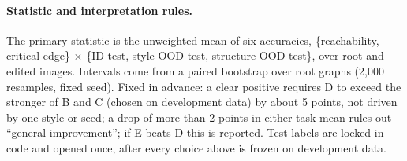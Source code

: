 \paragraph{Statistic and interpretation rules.}
The primary statistic is the unweighted mean of six accuracies, \{reachability, critical
edge\} $\times$ \{ID test, style-OOD test, structure-OOD test\}, over root and edited images.
Intervals come from a paired bootstrap over root graphs (2{,}000 resamples, fixed seed). Fixed
in advance: a clear positive requires D to exceed the stronger of B and C (chosen on
development data) by about 5 points, not driven by one style or seed; a drop of more than 2
points in either task mean rules out ``general improvement''; if E beats D this is reported.
Test labels are locked in code and opened once, after every choice above is frozen on
development data.
